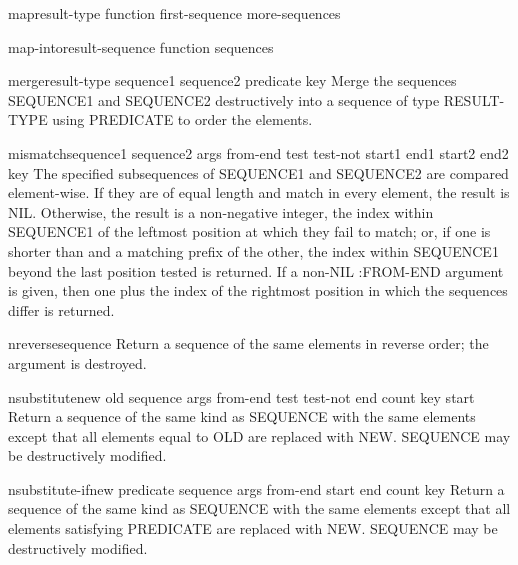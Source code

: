 \begin{function}{map}{result-type function first-sequence \rest more-sequences}
  
\end{function}

\begin{function}{map-into}{result-sequence function \rest sequences}
  
\end{function}

\begin{function}{merge}{result-type sequence1 sequence2 predicate \key key}
  Merge the sequences SEQUENCE1 and SEQUENCE2 destructively into a
   sequence of type RESULT-TYPE using PREDICATE to order the elements.
\end{function}

\begin{function}{mismatch}{sequence1 sequence2 \rest args \key from-end test test-not start1 end1 start2
 end2 key}
  The specified subsequences of SEQUENCE1 and SEQUENCE2 are compared
   element-wise. If they are of equal length and match in every element, the
   result is NIL. Otherwise, the result is a non-negative integer, the index
   within SEQUENCE1 of the leftmost position at which they fail to match; or,
   if one is shorter than and a matching prefix of the other, the index within
   SEQUENCE1 beyond the last position tested is returned. If a non-NIL
   :FROM-END argument is given, then one plus the index of the rightmost
   position in which the sequences differ is returned.
\end{function}

\begin{function}{nreverse}{sequence}
  Return a sequence of the same elements in reverse order; the argument
   is destroyed.
\end{function}

\begin{function}{nsubstitute}{new old sequence \rest args \key from-end test test-not end count key start}
  Return a sequence of the same kind as SEQUENCE with the same elements
  except that all elements equal to OLD are replaced with NEW. SEQUENCE
  may be destructively modified.
\end{function}

\begin{function}{nsubstitute-if}{new predicate sequence \rest args \key from-end start end count key}
  Return a sequence of the same kind as SEQUENCE with the same elements
   except that all elements satisfying PREDICATE are replaced with NEW.
   SEQUENCE may be destructively modified.
\end{function}

